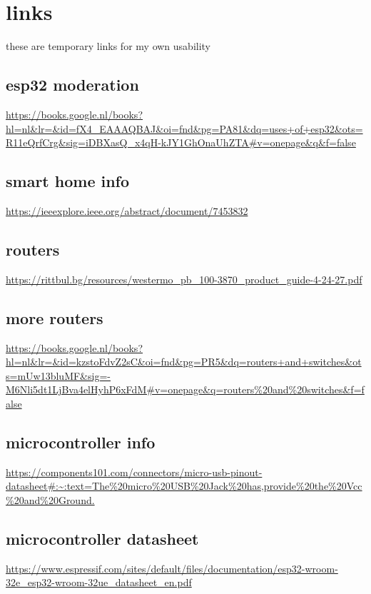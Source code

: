 \section{links}
these are temporary links for my own usability
\subsection{esp32 moderation}
\url{https://books.google.nl/books?hl=nl&lr=&id=fX4_EAAAQBAJ&oi=fnd&pg=PA81&dq=uses+of+esp32&ots=R11eQrfCrg&sig=iDBXasQ_x4qH-kJY1GhOnaUhZTA#v=onepage&q&f=false}


\subsection{smart home info}
\url{https://ieeexplore.ieee.org/abstract/document/7453832}


\subsection{routers}
\url{https://rittbul.bg/resources/westermo_pb_100-3870_product_guide-4-24-27.pdf}


\subsection{more routers}
\url{https://books.google.nl/books?hl=nl&lr=&id=kzstoFdvZ2sC&oi=fnd&pg=PR5&dq=routers+and+switches&ots=mUw13bluMF&sig=-M6Nli5dt1LjBva4elHyhP6xFdM#v=onepage&q=routers\%20and\%20switches&f=false}


\subsection{microcontroller info}
\url{https://components101.com/connectors/micro-usb-pinout-datasheet#:~:text=The\%20micro\%20USB\%20Jack\%20has,provide\%20the\%20Vcc\%20and\%20Ground.}

\subsection{microcontroller datasheet}
\url{https://www.espressif.com/sites/default/files/documentation/esp32-wroom-32e_esp32-wroom-32ue_datasheet_en.pdf}